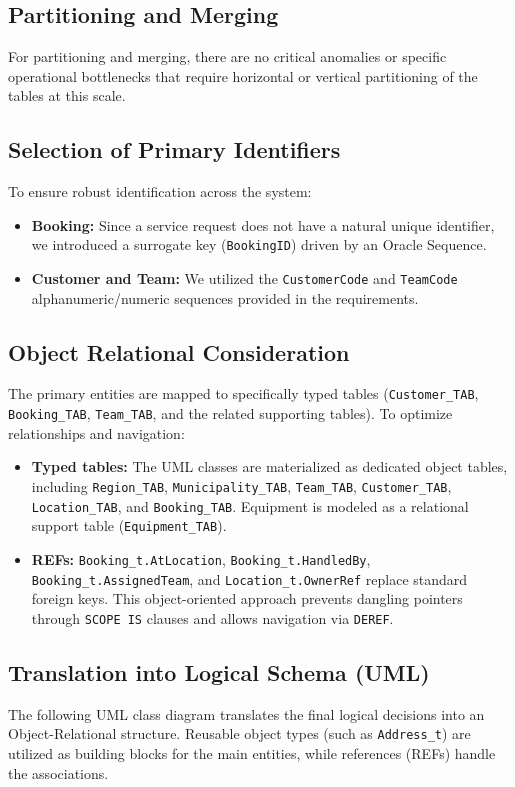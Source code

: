 \documentclass[12pt,a4paper]{article}
\begin{document}
\subsection{Partitioning and Merging}
For partitioning and merging, there are no critical anomalies or specific operational bottlenecks that require horizontal or vertical partitioning of the tables at this scale.

\subsection{Selection of Primary Identifiers}
To ensure robust identification across the system:
\begin{itemize}
    \item \textbf{Booking:} Since a service request does not have a natural unique identifier, we introduced a surrogate key (\texttt{BookingID}) driven by an Oracle Sequence.
    \item \textbf{Customer and Team:} We utilized the \texttt{CustomerCode} and \texttt{TeamCode} alphanumeric/numeric sequences provided in the requirements.
\end{itemize}

\subsection{Object Relational Consideration}
The primary entities are mapped to specifically typed tables (\texttt{Customer\_TAB}, \texttt{Booking\_TAB}, \texttt{Team\_TAB}, and the related supporting tables). To optimize relationships and navigation:
\begin{itemize}
    \item \textbf{Typed tables:} The UML classes are materialized as dedicated object tables, including \texttt{Region\_TAB}, \texttt{Municipality\_TAB}, \texttt{Team\_TAB}, \texttt{Customer\_TAB}, \texttt{Location\_TAB}, and \texttt{Booking\_TAB}. Equipment is modeled as a relational support table (\texttt{Equipment\_TAB}).
    \item \textbf{REFs:} \texttt{Booking\_t.AtLocation}, \texttt{Booking\_t.HandledBy}, \texttt{Booking\_t.AssignedTeam}, and \texttt{Location\_t.OwnerRef} replace standard foreign keys. This object-oriented approach prevents dangling pointers through \texttt{SCOPE IS} clauses and allows navigation via \texttt{DEREF}.
\end{itemize}

\subsection{Translation into Logical Schema (UML)}
The following UML class diagram translates the final logical decisions into an Object-Relational structure. Reusable object types (such as \texttt{Address\_t}) are utilized as building blocks for the main entities, while references (REFs) handle the associations.
\end{document}
